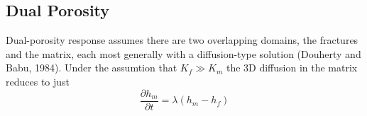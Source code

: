 \documentclass{article}
\begin{document}
\subsection{Dual Porosity}
Dual-porosity response assumes there are two overlapping domains, the
fractures and the matrix, each most generally with a diffusion-type
solution (Douherty and Babu, 1984).  Under the assumtion that $K_f \gg K_m$ the 3D diffusion in the matrix reduces to just 
\begin{equation}
  \label{eq:2}
  \frac{\partial h_m}{\partial t} = \lambda \left( h_m - h_f\right)
\end{equation}
\end{document}
